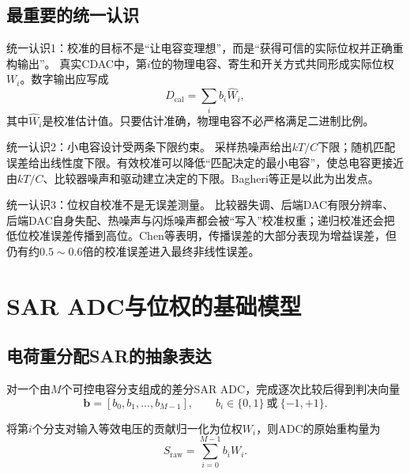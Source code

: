 \documentclass[UTF8,a4paper,11pt]{ctexart}
\begin{document}
\subsection{最重要的统一认识}

\begin{keybox}{统一认识1：校准的目标不是“让电容变理想”，而是“获得可信的实际位权并正确重构输出”。}
真实CDAC中，第$i$位的物理电容、寄生和开关方式共同形成实际位权$W_i$。数字输出应写成
\begin{equation}
D_{\mathrm{cal}}=\sum_i b_i\widehat{W}_i,
\end{equation}
其中$\widehat{W}_i$是校准估计值。只要估计准确，物理电容不必严格满足二进制比例。
\end{keybox}

\begin{keybox}{统一认识2：小电容设计受两条下限约束。}
采样热噪声给出$kT/C$下限；随机匹配误差给出线性度下限。有效校准可以降低“匹配决定的最小电容”，使总电容更接近由$kT/C$、比较器噪声和驱动建立决定的下限。Bagheri等正是以此为出发点。\cite{bagheri2020}
\end{keybox}

\begin{keybox}{统一认识3：位权自校准不是无误差测量。}
比较器失调、后端DAC有限分辨率、后端DAC自身失配、热噪声与闪烁噪声都会被“写入”校准权重；递归校准还会把低位校准误差传播到高位。Chen等表明，传播误差的大部分表现为增益误差，但仍有约$0.5\sim0.6$倍的校准误差进入最终非线性误差。\cite{chen2024}
\end{keybox}

\section{SAR ADC与位权的基础模型}

\subsection{电荷重分配SAR的抽象表达}

对一个由$M$个可控电容分支组成的差分SAR ADC，完成逐次比较后得到判决向量
\begin{equation}
\bm b=[b_0,b_1,\ldots,b_{M-1}],\qquad b_i\in\{0,1\}\ \text{或}\ \{-1,+1\}.
\end{equation}

将第$i$个分支对输入等效电压的贡献归一化为位权$W_i$，则ADC的原始重构量为
\begin{equation}
S_{\mathrm{raw}}=\sum_{i=0}^{M-1}b_iW_i.
\label{eq:weighted_sum}
\end{equation}
\end{document}
